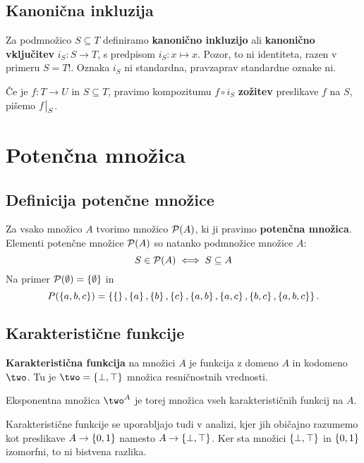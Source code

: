 \subsection{Kanonična inkluzija}

Za podmnožico $S \subseteq T$ definiramo \textbf{kanonično inkluzijo} ali \textbf{kanonično vključitev} $i_S : S \to T$, s predpisom $i_S : x \mapsto x$. Pozor, to ni identiteta, razen v primeru $S = T$!.
Oznaka $i_S$ ni standardna, pravzaprav standardne oznake ni.

Če je $f : T \to U$ in $S \subseteq T$, pravimo kompozitumu $f \circ i_S$ \textbf{zožitev} preslikave $f$ na $S$, pišemo $f{\big|}_{S}$.


\section{Potenčna množica}

\subsection{Definicija potenčne množice}

Za vsako množico $A$ tvorimo množico $\mathcal{P}(A)$, ki ji pravimo \textbf{potenčna množica}.
Elementi potenčne množice $\mathcal{P}(A)$ so natanko podmnožice množice $A$:
%
\begin{equation*}
    S \in \mathcal{P}(A) \iff S \subseteq A
\end{equation*}
%
Na primer $\mathcal{P}(\emptyset) = \left\{\emptyset\right\}$ in
%
\begin{equation*}
  P(\left\{a,b,c\right\}) = \left\{\left\{\right\}, \left\{a\right\}, \left\{b\right\}, \left\{c\right\}, \left\{a,b\right\}, \left\{a,c\right\}, \left\{b,c\right\}, \left\{a,b,c\right\}\right\}.
\end{equation*}


\subsection{Karakteristične funkcije}

\textbf{Karakteristična funkcija} na množici $A$ je funkcija z domeno $A$ in kodomeno $\two$. Tu je $\two = \set{\bot, \top}$ množica resničnostnih vrednosti.

Eksponentna množica $\two^A$ je torej množica vseh karakterističnih funkcij na $A$.

\begin{opomba}
  Karakteristične funkcije se uporabljajo tudi v analizi, kjer jih
  običajno razumemo kot preslikave $A \to \left\{0,1\right\}$ namesto $A \to \left\{\bot, \top\right\}$. Ker sta množici $\left\{\bot,\top\right\}$ in $\left\{0,1\right\}$ izomorfni, to ni bistvena razlika.
\end{opomba}

